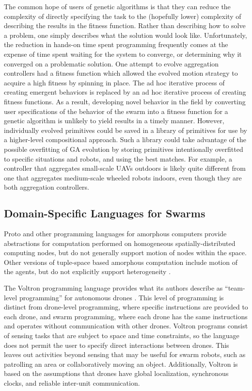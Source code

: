 The common hope of users of genetic algorithms is that they can reduce the complexity of directly specifying the task to the (hopefully lower) complexity of describing the results in the fitness function.
Rather than describing how to solve a problem, one simply describes what the solution would look like. 
Unfortunately, the reduction in hands-on time spent programming frequently comes at the expense of time spent waiting for the system to converge, or determining why it converged on a problematic solution. 
One attempt to evolve aggregation controllers had a fitness function which allowed the evolved motion strategy to acquire a high fitness by spinning in place.
The ad hoc iterative process of creating emergent behaviors is replaced by an ad hoc iterative process of creating fitness functions.
As a result, developing novel behavior in the field by converting user specifications of the behavior of the swarm into a fitness function for a genetic algorithm is unlikely to yield results in a timely manner. 
However, individually evolved primitives could be saved in a library of primitives for use by a higher-level compositional approach. 
Such a library could take advantage of the possible overfitting of GA evolution by storing primitives intentionally overfitted to specific situations and robots, and using the best matches. 
For example, a controller that aggregates small-scale UAVs outdoors is likely quite different from one that aggregates medium-scale wheeled robots indoors, even though they are both aggregation controllers. 

\subsection{Domain-Specific Languages for Swarms}

Proto and other programming languages for amorphous computers provide abstractions for computation performed on homogeneous spatially-distributed computing nodes, but do not generally support motion of nodes within the space. 
Other versions of tuple-space based amorphous computation include motion of the agents, but do not explicitly support heterogeneity \citep{viroli2012linda}.

The Voltron programming language provides what its authors describe as ``team-level programming'' for autonomous drones \citep{mottola2014team}.
This level of programming is distinct from drone-level programming, where specific instructions are provided to each drone, and swarm programming, where each drone has the same instructions and operates without communication with other drones.
Voltron programs consist of sensing tasks that are subject to space and time constraints, so the language does not permit the user to specify direct interactions between drones. 
This leaves out activities beyond sensing that may be useful for swarm robots, such as patrolling an area or collaboratively moving an object.
Additionally, Voltron is based on the assumptions that drones have global localization, synchronous clocks, and reliable inter-unit communication.   

